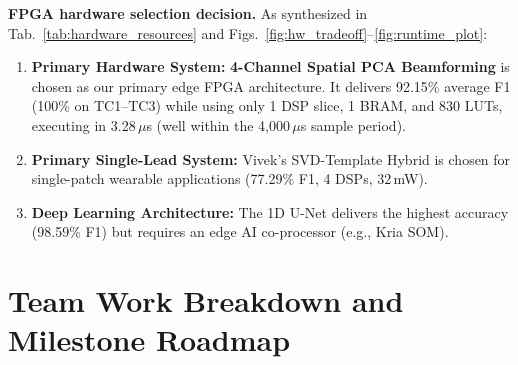 \documentclass[10pt,twocolumn,letterpaper]{article}
\newcommand{\newcontent}[1]{\textcolor{midtermblue}{#1}}
\begin{document}
\newcontent{\noindent\textbf{FPGA hardware selection decision.} As synthesized in Tab.~\ref{tab:hardware_resources} and Figs.~\ref{fig:hw_tradeoff}--\ref{fig:runtime_plot}:
\begin{enumerate}
    \item \textbf{Primary Hardware System:} \textbf{4-Channel Spatial PCA Beamforming} is chosen as our primary edge FPGA architecture. It delivers 92.15\% average F1 (100\% on TC1--TC3) while using only 1 DSP slice, 1 BRAM, and 830 LUTs, executing in 3.28\,$\mu$s (well within the 4,000\,$\mu$s sample period).
    \item \textbf{Primary Single-Lead System:} Vivek's SVD-Template Hybrid is chosen for single-patch wearable applications (77.29\% F1, 4 DSPs, 32\,mW).
    \item \textbf{Deep Learning Architecture:} The 1D U-Net delivers the highest accuracy (98.59\% F1) but requires an edge AI co-processor (e.g., Kria SOM).
\end{enumerate}
}

\section{Team Work Breakdown and Milestone Roadmap}
\label{sec:status}
\end{document}
